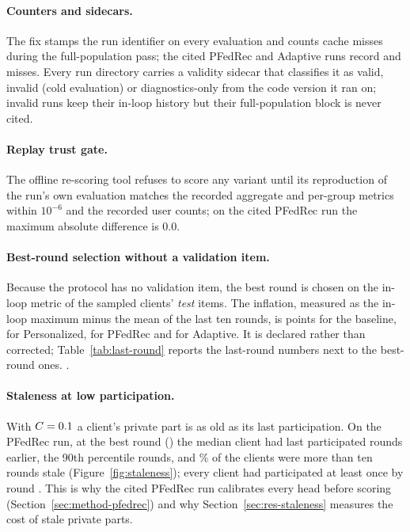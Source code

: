 \paragraph{Counters and sidecars.} The fix stamps the run identifier on every evaluation and
counts cache misses during the full-population pass; the cited PFedRec and Adaptive runs record
\CacheMissesPfedrec{} and \CacheMissesAdaptive{} misses. Every run directory carries a validity
sidecar that classifies it as valid, invalid (cold evaluation) or diagnostics-only from the code
version it ran on; invalid runs keep their in-loop history but their full-population block is
never cited.

\paragraph{Replay trust gate.} The offline re-scoring tool refuses to score any variant until
its reproduction of the run's own evaluation matches the recorded aggregate and per-group
metrics within $10^{-6}$ and the recorded user counts; on the cited PFedRec run the maximum
absolute difference is $0.0$.

\paragraph{Best-round selection without a validation item.} Because the protocol has no
validation item, the best round is chosen on the in-loop metric of the sampled clients'
\emph{test} items. The inflation, measured as the in-loop maximum minus the mean of the last ten
rounds, is \InflationBaseline{} \ndcg{} points for the baseline, \InflationPersonalized{} for
Personalized, \InflationPfedrec{} for PFedRec and \InflationAdaptive{} for Adaptive. It is
declared rather than corrected; Table~\ref{tab:last-round} reports the last-round numbers next
to the best-round ones. .

\paragraph{Staleness at low participation.} With $C=0.1$ a client's private part
is as old as its last participation. On the PFedRec run, at the best round
(\RunPfedrecBestRound) the median client had last participated \StaleMedian{} rounds earlier,
the 90th percentile \StalePNinety{} rounds, and \StaleOverTen\% of the clients were more than ten
rounds stale (Figure~\ref{fig:staleness}); every client had participated at least once by round
\ColdStartAllSeenRound. This is why the cited PFedRec run calibrates every head before scoring
(Section~\ref{sec:method-pfedrec}) and why Section~\ref{sec:res-staleness} measures the cost of
stale private parts.

